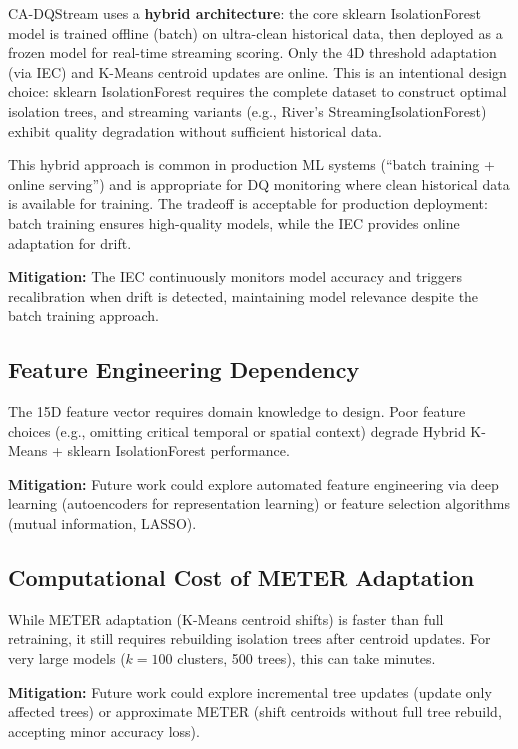 CA-DQStream uses a \textbf{hybrid architecture}: the core sklearn IsolationForest model is trained offline (batch) on ultra-clean historical data, then deployed as a frozen model for real-time streaming scoring. Only the 4D threshold adaptation (via IEC) and K-Means centroid updates are online. This is an intentional design choice: sklearn IsolationForest requires the complete dataset to construct optimal isolation trees, and streaming variants (e.g., River's StreamingIsolationForest) exhibit quality degradation without sufficient historical data.

This hybrid approach is common in production ML systems (``batch training + online serving'') and is appropriate for DQ monitoring where clean historical data is available for training. The tradeoff is acceptable for production deployment: batch training ensures high-quality models, while the IEC provides online adaptation for drift.

\textbf{Mitigation:} The IEC continuously monitors model accuracy and triggers recalibration when drift is detected, maintaining model relevance despite the batch training approach.

\subsection{Feature Engineering Dependency}

The 15D feature vector requires domain knowledge to design. Poor feature choices (e.g., omitting critical temporal or spatial context) degrade Hybrid K-Means + sklearn IsolationForest performance.

\textbf{Mitigation:} Future work could explore automated feature engineering via deep learning (autoencoders for representation learning) or feature selection algorithms (mutual information, LASSO).

\subsection{Computational Cost of METER Adaptation}

While METER adaptation (K-Means centroid shifts) is faster than full retraining, it still requires rebuilding isolation trees after centroid updates. For very large models ($k=100$ clusters, 500 trees), this can take minutes.

\textbf{Mitigation:} Future work could explore incremental tree updates (update only affected trees) or approximate METER (shift centroids without full tree rebuild, accepting minor accuracy loss).

